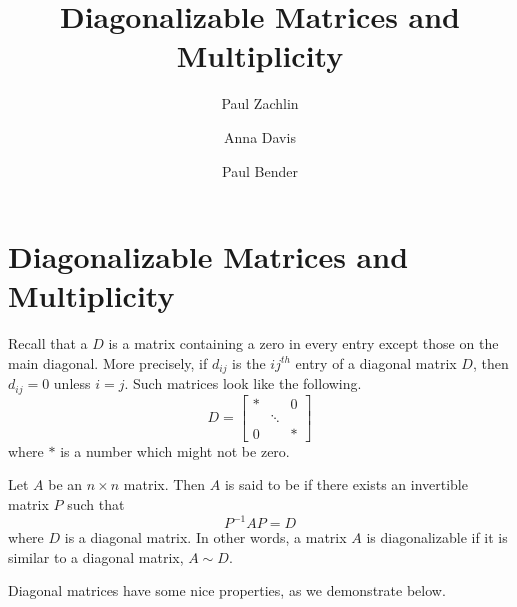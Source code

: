 \documentclass{ximera}
\author{Paul Zachlin \and Anna Davis \and Paul Bender} \title{Diagonalizable Matrices and Multiplicity} \license{CC-BY 4.0}
\begin{document}
\begin{abstract}
\end{abstract}
\maketitle

\section*{Diagonalizable Matrices and Multiplicity}
Recall that a  $D$ is a matrix containing a zero in every entry except those on the main diagonal.  More precisely, if $d_{ij}$ is the $ij^{th}$ entry of a diagonal matrix $D$, then
$d_{ij}=0$ unless $i=j$. Such
matrices look like the following.
\begin{equation*}
D = 
\begin{bmatrix}
* &  & 0 \\
& \ddots &  \\
0 &  & *
\end{bmatrix}
\end{equation*}
where $*$ is a number which might not be zero.


\begin{definition}\label{def:diagonalizable}
Let $A$ be an $n\times n$ matrix. Then $A$ is said to be  if there exists an invertible matrix $P$ such that
\begin{equation*}
P^{-1}AP=D
\end{equation*}
where $D$ is a diagonal matrix.  In other words, a matrix $A$ is diagonalizable if it is similar to a diagonal matrix, $A \sim D$.
\end{definition}


Diagonal matrices have some nice properties, as we demonstrate below.
\end{document}
